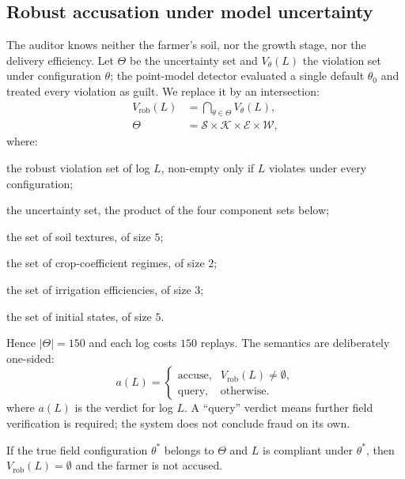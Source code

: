 \subsection{Robust accusation under model uncertainty}
\label{sec:robust}

The auditor knows neither the farmer's soil, nor the growth stage, nor the
delivery efficiency. Let $\Theta$ be the uncertainty set and $V_\theta(L)$
the violation set under configuration $\theta$; the point-model detector
evaluated a single default $\theta_0$ and treated every violation as guilt.
We replace it by an intersection:
\begin{equation}
\begin{aligned}
V_{\mathrm{rob}}(L)&=\bigcap_{\theta\in\Theta}V_\theta(L),\\
\Theta&=\mathcal{S}\times\mathcal{K}\times\mathcal{E}\times\mathcal{W},
\end{aligned}
\label{eq:robust}
\end{equation}
where:
\begin{symbolist}
\item[$V_{\mathrm{rob}}(L)$] the robust violation set of log $L$, non-empty only if $L$ violates under every configuration;
\item[$\Theta$] the uncertainty set, the product of the four component sets below;
\item[$\mathcal{S}$] the set of soil textures, of size $5$;
\item[$\mathcal{K}$] the set of crop-coefficient regimes, of size $2$;
\item[$\mathcal{E}$] the set of irrigation efficiencies, of size $3$;
\item[$\mathcal{W}$] the set of initial states, of size $5$.
\end{symbolist}

Hence $|\Theta|=150$ and each log costs $150$ replays. The semantics are
deliberately one-sided:
\begin{equation}
a(L)=
\begin{cases}
\text{accuse}, & V_{\mathrm{rob}}(L)\neq\emptyset,\\
\text{query}, & \text{otherwise}.
\end{cases}
\label{eq:verdict}
\end{equation}
where $a(L)$ is the verdict for log $L$. A ``query'' verdict means further field
verification is required; the system does not conclude fraud on its own.

\begin{proposition}
\label{prop:noalarm}
If the true field configuration $\theta^{*}$ belongs to $\Theta$ and $L$ is
compliant under $\theta^{*}$, then $V_{\mathrm{rob}}(L)=\emptyset$ and the farmer
is not accused.
\end{proposition}

